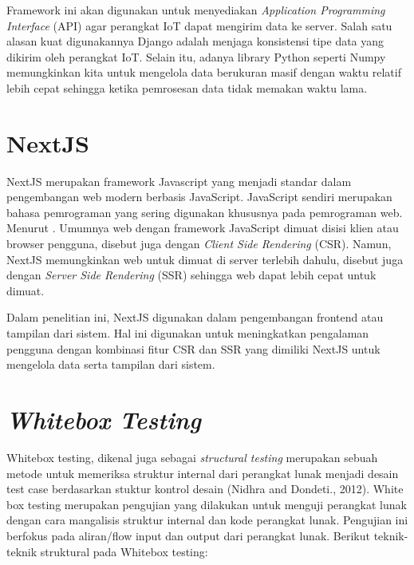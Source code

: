 Framework ini akan digunakan untuk menyediakan \textit{Application Programming Interface} (API) agar perangkat IoT dapat mengirim data ke server. Salah satu alasan kuat digunakannya Django adalah menjaga konsistensi tipe data yang dikirim oleh perangkat IoT. Selain itu, adanya library Python seperti Numpy memungkinkan kita untuk mengelola data berukuran masif dengan waktu relatif lebih cepat sehingga ketika pemrosesan data tidak memakan waktu lama.

\section{NextJS}

NextJS merupakan framework Javascript yang menjadi standar dalam pengembangan web modern berbasis JavaScript. JavaScript sendiri merupakan bahasa pemrograman yang sering digunakan khususnya pada pemrograman web. Menurut \textcite{article:tomasdottir}. Umumnya web dengan framework JavaScript dimuat disisi klien atau browser pengguna, disebut juga dengan \textit{Client Side Rendering}  (CSR). Namun, NextJS memungkinkan web untuk dimuat di server terlebih dahulu, disebut juga dengan \textit{Server Side Rendering} (SSR) sehingga web dapat lebih cepat untuk dimuat.

Dalam penelitian ini, NextJS digunakan dalam pengembangan frontend atau tampilan dari sistem. Hal ini digunakan untuk meningkatkan pengalaman pengguna dengan kombinasi fitur CSR dan SSR yang dimiliki NextJS untuk mengelola data serta tampilan dari sistem.

\section{\textit{Whitebox Testing}}

Whitebox testing, dikenal juga sebagai \textit{structural testing} merupakan sebuah metode untuk memeriksa struktur internal dari perangkat lunak menjadi desain test case berdasarkan stuktur kontrol desain (Nidhra and Dondeti., 2012). White box testing merupakan pengujian yang dilakukan untuk menguji perangkat lunak dengan cara mangalisis struktur internal dan kode perangkat lunak. Pengujian ini berfokus pada aliran/flow input dan output dari perangkat lunak. Berikut teknik-teknik struktural pada Whitebox testing:

